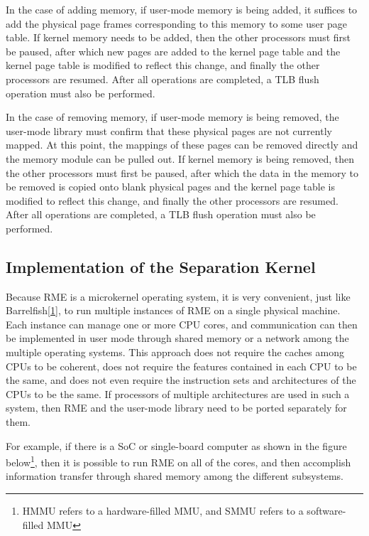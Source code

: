 In the case of adding memory, if user-mode memory is being added, it suffices to add the physical page frames corresponding to this memory to some user page table. If kernel memory needs to be added, then the other processors must first be paused, after which new pages are added to the kernel page table and the kernel page table is modified to reflect this change, and finally the other processors are resumed. After all operations are completed, a TLB flush operation must also be performed.

In the case of removing memory, if user-mode memory is being removed, the user-mode library must confirm that these physical pages are not currently mapped. At this point, the mappings of these pages can be removed directly and the memory module can be pulled out. If kernel memory is being removed, then the other processors must first be paused, after which the data in the memory to be removed is copied onto blank physical pages and the kernel page table is modified to reflect this change, and finally the other processors are resumed. After all operations are completed, a TLB flush operation must also be performed.

\subsection{Implementation of the Separation Kernel}\label{subsec:9-isolated-kernel}

Because RME is a microkernel operating system, it is very convenient, just like Barrelfish\hyperref[cite:9-1]{{[}1{]}}, to run multiple instances of RME on a single physical machine. Each instance can manage one or more CPU cores, and communication can then be implemented in user mode through shared memory or a network among the multiple operating systems. This approach does not require the caches among CPUs to be coherent, does not require the features contained in each CPU to be the same, and does not even require the instruction sets and architectures of the CPUs to be the same. If processors of multiple architectures are used in such a system, then RME and the user-mode library need to be ported separately for them.

For example, if there is a SoC or single-board computer as shown in the figure below\footnote{HMMU refers to a hardware-filled MMU, and SMMU refers to a software-filled MMU}, then it is possible to run RME on all of the cores, and then accomplish information transfer through shared memory among the different subsystems.

